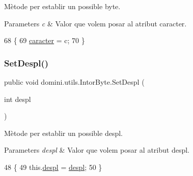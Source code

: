 Mètode per establir un possible byte. 


\begin{DoxyParams}{Parameters}
{\em c} & Valor que volem posar al atribut caracter. \\
\hline
\end{DoxyParams}

\begin{DoxyCode}
68    \{
69       \hyperlink{classdomini_1_1utils_1_1IntorByte_adbb2e8c31ead2f27d85ff39683b9a8a7}{caracter} = c;
70    \}
\end{DoxyCode}
\mbox{\label{classdomini_1_1utils_1_1IntorByte_a01c26f8a3a94b2bc31fda2f5989fca00}} 
\subsubsection{\texorpdfstring{Set\+Despl()}{SetDespl()}}
{\footnotesize\ttfamily public void domini.\+utils.\+Intor\+Byte.\+Set\+Despl (\begin{DoxyParamCaption}\item[{int}]{despl }\end{DoxyParamCaption})\hspace{0.3cm}{\ttfamily [inline]}}



Mètode per establir un possible despl. 


\begin{DoxyParams}{Parameters}
{\em despl} & Valor que volem posar al atribut despl. \\
\hline
\end{DoxyParams}

\begin{DoxyCode}
48    \{
49       this.\hyperlink{classdomini_1_1utils_1_1IntorByte_a83872b8acc9ab187acbc2175d5bf320e}{despl} = \hyperlink{classdomini_1_1utils_1_1IntorByte_a83872b8acc9ab187acbc2175d5bf320e}{despl};
50    \}
\end{DoxyCode}
\mbox{\label{classdomini_1_1utils_1_1IntorByte_a2371fca6d26baf4098466dbb3089052d}} 
